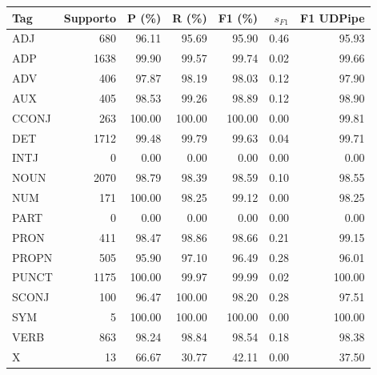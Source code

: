 \begin{tabular}{lrrrrrr}
\toprule
Tag & Supporto & P (\%) & R (\%) & F1 (\%) & $s_{F1}$ & F1 UDPipe \\
\midrule
ADJ & 680 & 96.11 & 95.69 & 95.90 & 0.46 & 95.93 \\
ADP & 1638 & 99.90 & 99.57 & 99.74 & 0.02 & 99.66 \\
ADV & 406 & 97.87 & 98.19 & 98.03 & 0.12 & 97.90 \\
AUX & 405 & 98.53 & 99.26 & 98.89 & 0.12 & 98.90 \\
CCONJ & 263 & 100.00 & 100.00 & 100.00 & 0.00 & 99.81 \\
DET & 1712 & 99.48 & 99.79 & 99.63 & 0.04 & 99.71 \\
INTJ & 0 & 0.00 & 0.00 & 0.00 & 0.00 & 0.00 \\
NOUN & 2070 & 98.79 & 98.39 & 98.59 & 0.10 & 98.55 \\
NUM & 171 & 100.00 & 98.25 & 99.12 & 0.00 & 98.25 \\
PART & 0 & 0.00 & 0.00 & 0.00 & 0.00 & 0.00 \\
PRON & 411 & 98.47 & 98.86 & 98.66 & 0.21 & 99.15 \\
PROPN & 505 & 95.90 & 97.10 & 96.49 & 0.28 & 96.01 \\
PUNCT & 1175 & 100.00 & 99.97 & 99.99 & 0.02 & 100.00 \\
SCONJ & 100 & 96.47 & 100.00 & 98.20 & 0.28 & 97.51 \\
SYM & 5 & 100.00 & 100.00 & 100.00 & 0.00 & 100.00 \\
VERB & 863 & 98.24 & 98.84 & 98.54 & 0.18 & 98.38 \\
X & 13 & 66.67 & 30.77 & 42.11 & 0.00 & 37.50 \\
\bottomrule
\end{tabular}